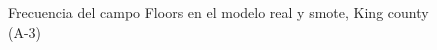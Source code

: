 \begin{figure}[H]
    \centering
    
    \caption{Frecuencia del campo Floors en el modelo real y smote, King county (A-3)}
    \label{frecuency-smote-floors}
\end{figure}